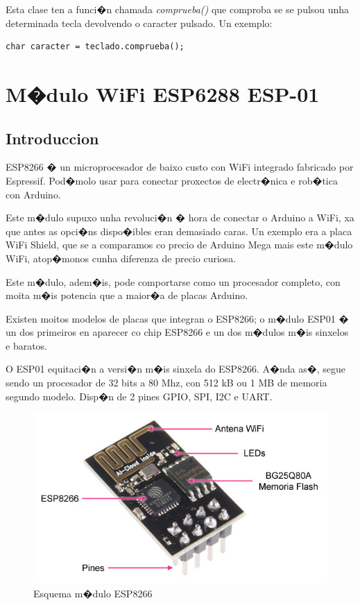 \documentclass[11pt,twoside]{book}
\begin{document}
Esta clase ten a funci�n chamada \textit{comprueba()} que comproba se se pulsou unha determinada tecla devolvendo o caracter pulsado. Un exemplo:

\begin{lstlisting}
char caracter = teclado.comprueba();
\end{lstlisting}


\chapter{M�dulo WiFi ESP6288 ESP-01}

\section{Introduccion}

ESP8266 � un microprocesador de baixo custo con WiFi integrado fabricado por Espressif. Pod�molo usar para conectar proxectos de electr�nica e rob�tica con Arduino.

Este m�dulo supuxo unha revoluci�n � hora de conectar o Arduino a WiFi, xa que antes as opci�ns dispo�ibles eran demasiado caras. Un exemplo era a placa WiFi Shield, que se a comparamos co precio de Arduino Mega mais este m�dulo WiFi, atop�monos cunha diferenza de precio curiosa.

Este m�dulo, adem�is, pode comportarse como un procesador completo, con moita m�is potencia que a maior�a de placas Arduino.

Existen moitos modelos de placas que integran o ESP8266; o m�dulo ESP01 � un dos primeiros en aparecer co chip ESP8266 e un dos m�dulos m�is sinxelos e baratos.

O ESP01 equitaci�n a versi�n m�is sinxela do ESP8266. A�nda as�, segue sendo un procesador de 32 bits a 80 Mhz, con 512 kB ou 1 MB de memoria segundo modelo. Disp�n de 2 pines GPIO, SPI, I2C e UART.

\begin{figure}[H]
	\begin{center}
		\includegraphics[width=12cm]{images/esp8266_conexion.jpg}
	\end{center}
	\caption{Esquema m�dulo ESP8266 }
	\label{fig:EsquemaESP8266}
\end{figure}
\end{document}
